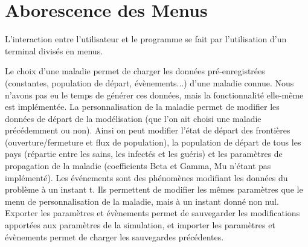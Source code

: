 \documentclass[12pt,a4paper]{report}
\begin{document}
\section*{Aborescence des Menus}
\begin{flushleft}

L'interaction entre l'utilisateur et le programme se fait par l'utilisation d'un terminal divisés en menus.


Le choix d'une maladie permet de charger les données pré-enregistrées (constantes, population de départ, évènements...) d'une maladie connue. Nous n'avons pas eu le temps de générer ces données, mais la fonctionnalité elle-même est implémentée.
La personnalisation de la maladie permet de modifier les données de départ de la modélisation (que l'on ait choisi une maladie précédemment ou non). Ainsi on peut modifier l'état de départ des frontières (ouverture/fermeture et flux de population), la 
population de départ de tous les pays (répartie entre les sains, les infectés et les guéris) et les paramètres de propagation de la maladie (coefficients Beta et Gamma, Mu n'étant pas implémenté).
Les événements sont des phénomènes modifiant les données du problème à un instant t. Ils permettent de modifier les mêmes paramètres que le menu de personnalisation de la maladie, mais à un instant donné non nul. 
Exporter les paramètres et évènements permet de sauvegarder les modifications apportées aux paramètres de la simulation, et importer les paramètres et évènements permet de charger les sauvegardes précédentes.

\end{flushleft}
\end{document}
